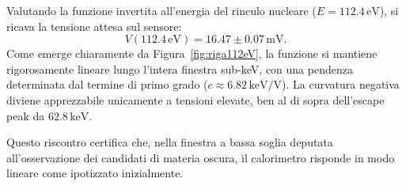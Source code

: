 Valutando la funzione invertita all'energia del rinculo nucleare ($E = 112.4\,\text{eV}$), si ricava la tensione attesa sul sensore:
\begin{equation}
    V(112.4\,\text{eV}) = 16.47 \pm 0.07\,\text{mV}.
\end{equation}
Come emerge chiaramente da Figura~\ref{fig:riga112eV}, la funzione si mantiene rigorosamente lineare lungo l'intera finestra sub-keV, con una pendenza determinata dal termine di primo grado ($c \approx 6.82\,\text{keV/V}$). La curvatura negativa diviene apprezzabile unicamente a tensioni elevate, ben al di sopra dell'escape peak da $62.8\,\text{keV}$. 

Questo riscontro certifica che, nella finestra a bassa soglia deputata all'osservazione dei candidati di materia oscura, il calorimetro risponde in modo lineare come ipotizzato inizialmente.